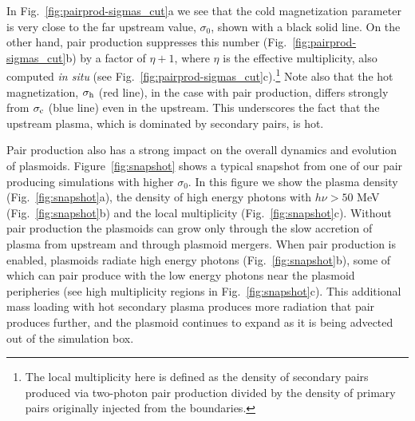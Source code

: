 In Fig.~\ref{fig:pairprod-sigmas_cut}a we see that the cold magnetization parameter is very close to the far upstream value, $\sigma_0$, shown with a black solid line. On the other hand, pair production suppresses this number (Fig.~\ref{fig:pairprod-sigmas_cut}b) by a factor of $\eta +1$, where $\eta$ is the effective multiplicity, also computed {\it in situ} (see Fig.~\ref{fig:pairprod-sigmas_cut}c).\footnote{The local multiplicity here is defined as the density of secondary pairs produced via two-photon pair production divided by the density of primary pairs originally injected from the boundaries.} Note also that the hot magnetization, $\sigma_{\rm h}$ (red line), in the case with pair production, differs strongly from $\sigma_{\rm c}$ (blue line) even in the upstream. This underscores the fact that the upstream plasma, which is dominated by secondary pairs, is hot.

Pair production also has a strong impact on the overall dynamics and evolution of plasmoids. Figure~\ref{fig:snapshot} shows a typical snapshot from one of our pair producing simulations with higher $\sigma_0$. In this figure we show the plasma density (Fig.~\ref{fig:snapshot}a), the density of high energy photons with $h\nu>50$ MeV (Fig.~\ref{fig:snapshot}b) and the local multiplicity (Fig.~\ref{fig:snapshot}c).
Without pair production the plasmoids can grow only through the slow accretion of plasma from upstream and through plasmoid mergers. When pair production is enabled, plasmoids radiate high energy photons (Fig.~\ref{fig:snapshot}b), some of which can pair produce with the low energy photons near the plasmoid peripheries (see high multiplicity regions in Fig.~\ref{fig:snapshot}c). This additional mass loading with hot secondary plasma produces more radiation that pair produces further, and the plasmoid continues to expand as it is being advected out of the simulation box.

